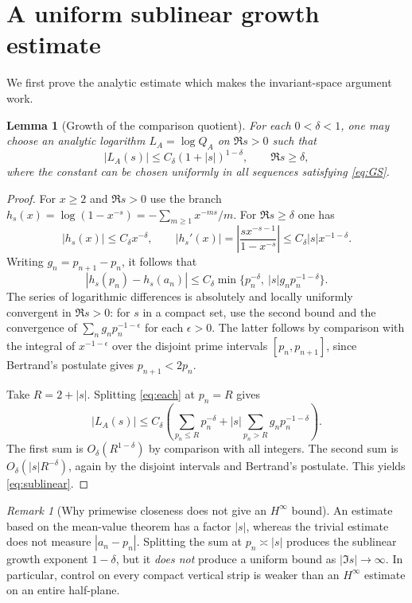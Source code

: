 \documentclass[12pt,letterpaper]{article}
\newtheorem{lemma}[theorem]{Lemma}
\theoremstyle{remark}
\newtheorem{remark}[theorem]{Remark}
\numberwithin{equation}{section}
\begin{document}
\section{A uniform sublinear growth estimate}
We first prove the analytic estimate which makes the invariant-space argument work.

\begin{lemma}[Growth of the comparison quotient]\label{lem:growth}
For each $0<\delta<1$, one may choose an analytic logarithm $L_A=\log Q_A$ on $\Re s>0$ such that
\begin{equation}\label{eq:sublinear}
 \left|L_A(s)\right|\le C_\delta(1+|s|)^{1-\delta},\qquad \Re s\ge\delta,
\end{equation}
where the constant can be chosen \emph{uniformly in all sequences} satisfying \eqref{eq:GS}.
\end{lemma}
\begin{proof}
For $x\ge2$ and $\Re s>0$ use the branch
$h_s(x)=\log(1-x^{-s})=-\sum_{m\ge1}x^{-ms}/m$.
For $\Re s\ge\delta$ one has
\[
 |h_s(x)|\le C_\delta x^{-\delta},\qquad
 |h_s'(x)|=\left|\frac{s x^{-s-1}}{1-x^{-s}}\right|
 \le C_\delta |s|x^{-1-\delta}.
\]
Writing $g_n=p_{n+1}-p_n$, it follows that
\begin{equation}\label{eq:each}
 |h_s(p_n)-h_s(a_n)|
 \le C_\delta\min\big\{p_n^{-\delta},\ |s|g_n p_n^{-1-\delta}\big\}.
\end{equation}
The series of logarithmic differences is absolutely and locally uniformly convergent in $\Re s>0$: for $s$ in a compact set, use the second bound and the convergence of $\sum_n g_np_n^{-1-\epsilon}$ for each $\epsilon>0$. The latter follows by comparison with the integral of $x^{-1-\epsilon}$ over the disjoint prime intervals $[p_n,p_{n+1}]$, since Bertrand's postulate gives $p_{n+1}<2p_n$.

Take $R=2+|s|$. Splitting \eqref{eq:each} at $p_n=R$ gives
\[
 |L_A(s)|\le C_\delta\left(\sum_{p_n\le R}p_n^{-\delta}
 +|s|\sum_{p_n>R}g_np_n^{-1-\delta}\right).
\]
The first sum is $O_\delta(R^{1-\delta})$ by comparison with all integers. The second sum is $O_\delta(|s|R^{-\delta})$, again by the disjoint intervals and Bertrand's postulate. This yields \eqref{eq:sublinear}.
\end{proof}

\begin{remark}[Why primewise closeness does not give an $H^\infty$ bound]
An estimate based on the mean-value theorem has a factor $|s|$, whereas the trivial estimate does not measure $|a_n-p_n|$. Splitting the sum at $p_n\asymp|s|$ produces the sublinear growth exponent $1-\delta$, but it \emph{does not} produce a uniform bound as $|\Im s|\to\infty$. In particular, control on every compact vertical strip is weaker than an $H^\infty$ estimate on an entire half-plane.
\end{remark}
\end{document}
